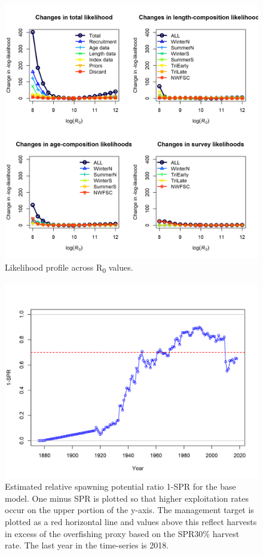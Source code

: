 \documentclass[12pt,]{article}
\begin{document}
\FloatBarrier

\begin{figure}
\centering
\includegraphics{Figures/piner_panel_R0.png}
\caption{Likelihood profile across R\textsubscript{0} values.
\label{fig:piner_R0}}
\end{figure}

\FloatBarrier  

\begin{figure}
\centering
\includegraphics{r4ss/plots_mod1/SPR2_minusSPRseries.png}
\caption{Estimated relative spawning potential ratio 1-SPR for the base
model. One minus SPR is plotted so that higher exploitation rates occur
on the upper portion of the y-axis. The management target is plotted as
a red horizontal line and values above this reflect harvests in excess
of the overfishing proxy based on the SPR30\% harvest rate. The last
year in the time-series is 2018. \label{fig:SPR_all_fig}}
\end{figure}
\end{document}
